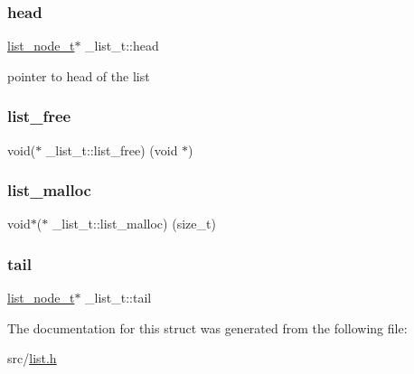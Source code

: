 \subsubsection{\texorpdfstring{head}{head}}
{\footnotesize\ttfamily \hyperlink{list_8h_ac3a9fd33fd17f716d16148fdb28c2b2c}{list\+\_\+node\+\_\+t}$\ast$ \+\_\+list\+\_\+t\+::head}



pointer to head of the list 

\hypertarget{struct__list__t_a71f53c5e245e5e02b92927f390156bc8}{}\label{struct__list__t_a71f53c5e245e5e02b92927f390156bc8} 
\subsubsection{\texorpdfstring{list\+\_\+free}{list\_free}}
{\footnotesize\ttfamily void($\ast$ \+\_\+list\+\_\+t\+::list\+\_\+free) (void $\ast$)}

\hypertarget{struct__list__t_a5209da394bf99f322d26b691a2691408}{}\label{struct__list__t_a5209da394bf99f322d26b691a2691408} 
\subsubsection{\texorpdfstring{list\+\_\+malloc}{list\_malloc}}
{\footnotesize\ttfamily void$\ast$($\ast$ \+\_\+list\+\_\+t\+::list\+\_\+malloc) (size\+\_\+t)}

\hypertarget{struct__list__t_a90c071bbb52c78a6f553c7040d92a448}{}\label{struct__list__t_a90c071bbb52c78a6f553c7040d92a448} 
\subsubsection{\texorpdfstring{tail}{tail}}
{\footnotesize\ttfamily \hyperlink{list_8h_ac3a9fd33fd17f716d16148fdb28c2b2c}{list\+\_\+node\+\_\+t}$\ast$ \+\_\+list\+\_\+t\+::tail}



The documentation for this struct was generated from the following file\+:\begin{DoxyCompactItemize}
\item 
src/\hyperlink{list_8h}{list.\+h}\end{DoxyCompactItemize}
